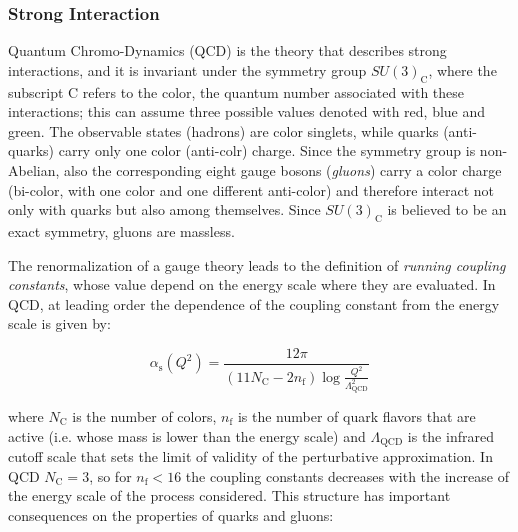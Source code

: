 \subsubsection{Strong Interaction}
\label{sec:strong}

Quantum Chromo-Dynamics (QCD) is the theory that describes strong interactions, and it is invariant under the symmetry group $SU(3)_\mathrm{C}$, where the subscript C refers to the color, the quantum number associated with these interactions; this can assume three possible values denoted with red, blue and green. The observable states (hadrons) are color singlets, while quarks (anti-quarks) carry only one color (anti-colr) charge. Since the symmetry group is non-Abelian, also the corresponding eight gauge bosons (\textit{gluons}) carry a color charge (bi-color, with one color and one different anti-color) and therefore interact not only with quarks but also among themselves. Since $SU(3)_\mathrm{C}$ is believed to be an exact symmetry,  gluons are massless. 

The renormalization of a gauge theory leads to the definition of \textit{running coupling constants}, whose value depend on the energy scale where they are evaluated. In QCD, at leading order the dependence of the coupling constant from the energy scale is given by:

\begin{equation}
\alpha_\mathrm{s}(Q^2)=\frac{12\pi}{\left(11N_\mathrm{C}-2n_\mathrm{f}\right)\log{\frac{Q^2}{\Lambda_\mathrm{QCD}^2}}} 
\label{eq:alfaQCD}
\end{equation}

\noindent where $N_\mathrm{C}$ is the number of colors, $n_\mathrm{f}$ is the number of quark flavors that are active (i.e. whose mass is lower than the energy scale) and $\Lambda_\mathrm{QCD}$ is the infrared cutoff scale that sets the limit of validity of the perturbative approximation. In QCD $N_\mathrm{C} = 3$, so for $n_\mathrm{f}<16$ the coupling constants decreases with the increase of the energy scale of the process considered. This structure has important consequences on the properties of quarks and gluons:

